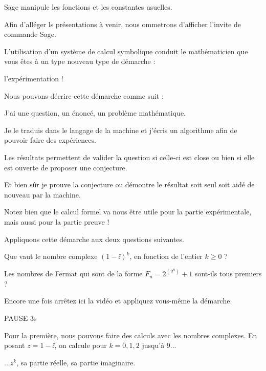 \change 

\change
Sage manipule les fonctions et les constantes usuelles. 
 
Afin d'alléger ls présentations à venir, nous ommetrons d'afficher l'invite de commande Sage.

\diapo


L'utilisation d'un système de calcul symbolique 
conduit le mathématicien que vous êtes à un type nouveau type 
de démarche  : 

l'expérimentation !

Nous pouvons décrire cette démarche comme suit : 

\change

J'ai une question, un énoncé, un problème mathématique.
  
\change
Je le traduis dans le langage de la machine et j'écris un algorithme afin de pouvoir faire des expériences.

\change
Les résultats permettent de valider la question si celle-ci est close ou bien si elle est ouverte de proposer une conjecture.

\change
Et bien sûr je prouve la conjecture ou démontre le résultat soit seul soit aidé de nouveau par la machine.

Notez bien que le calcul formel va nous être utile pour la partie
expérimentale, mais aussi pour la partie preuve !



\diapo

Appliquons cette démarche %
aux deux questions suivantes.

Que vaut le nombre complexe $(1-\ii)^k$, en fonction 
de l'entier $k\ge 0$ ?

Les nombres de Fermat qui sont de la forme 
$F_n = 2^{(2^n)}+1$ sont-ils tous premiers ?


Encore une fois arrêtez ici la vidéo et appliquez vous-même la démarche.


PAUSE 3s

\change

Pour la première, nous pouvons faire des calculs avec les nombres complexes.
En posant $z= 1 - \ii$, on calcule pour $k=0,1,2$ jusqu'à $9$...

\change 
...$z^k$, sa partie réelle, sa partie imaginaire.

